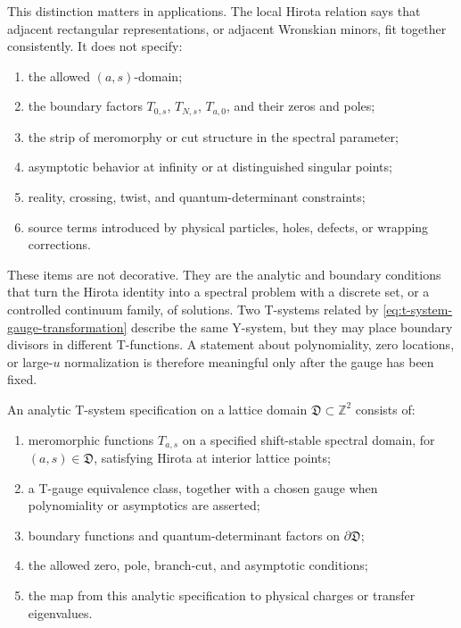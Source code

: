 This distinction matters in applications.  The local Hirota relation says
that adjacent rectangular representations, or adjacent Wronskian minors,
fit together consistently.  It does not specify:
\begin{enumerate}
\item the allowed \((a,s)\)-domain;
\item the boundary factors \(T_{0,s}\), \(T_{N,s}\), \(T_{a,0}\), and their
      zeros and poles;
\item the strip of meromorphy or cut structure in the spectral parameter;
\item asymptotic behavior at infinity or at distinguished singular points;
\item reality, crossing, twist, and quantum-determinant constraints;
\item source terms introduced by physical particles, holes, defects, or
      wrapping corrections.
\end{enumerate}
These items are not decorative.  They are the analytic and boundary conditions
that turn the Hirota
identity into a spectral problem with a discrete set, or a controlled
continuum family, of solutions.  Two T-systems related by
\eqref{eq:t-system-gauge-transformation} describe the same Y-system, but they
may place boundary divisors in different T-functions.  A statement about
polynomiality, zero locations, or large-\(u\) normalization is therefore
meaningful only after the gauge has been fixed.

\begin{definition}
\label{def:analytic-t-system-datum}
An analytic T-system specification on a lattice domain
\(\mathfrak D\subset\mathbb Z^2\)
consists of:
\begin{enumerate}
\item meromorphic functions \(T_{a,s}\) on a specified shift-stable spectral
      domain, for \((a,s)\in\mathfrak D\), satisfying Hirota at interior
      lattice points;
\item a T-gauge equivalence class, together with a chosen gauge when
      polynomiality or asymptotics are asserted;
\item boundary functions and quantum-determinant factors on
      \(\partial\mathfrak D\);
\item the allowed zero, pole, branch-cut, and asymptotic conditions;
\item the map from this analytic specification to physical charges or transfer
      eigenvalues.
\end{enumerate}
\end{definition}

